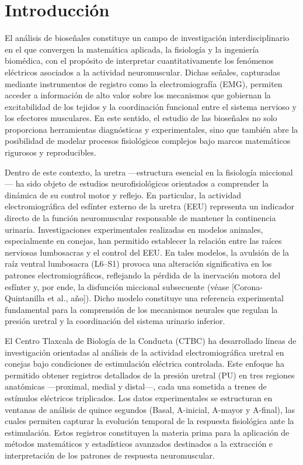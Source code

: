 \chapter*{Introducción}
\setcounter{page}{1}


\noindent El análisis de bioseñales constituye un campo de investigación interdisciplinario en el que convergen la matemática aplicada, la fisiología y la ingeniería biomédica, con el propósito de interpretar cuantitativamente los fenómenos eléctricos asociados a la actividad neuromuscular. Dichas señales, capturadas mediante instrumentos de registro como la electromiografía (EMG), permiten acceder a información de alto valor sobre los mecanismos que gobiernan la excitabilidad de los tejidos y la coordinación funcional entre el sistema nervioso y los efectores musculares. En este sentido, el estudio de las bioseñales no solo proporciona herramientas diagnósticas y experimentales, sino que también abre la posibilidad de modelar procesos fisiológicos complejos bajo marcos matemáticos rigurosos y reproducibles. 

\noindent Dentro de este contexto, la uretra —estructura esencial en la fisiología miccional— ha sido objeto de estudios neurofisiológicos orientados a comprender la dinámica de su control motor y reflejo. En particular, la actividad electromiográfica del esfínter externo de la uretra (EEU) representa un indicador directo de la función neuromuscular responsable de mantener la continencia urinaria. Investigaciones experimentales realizadas en modelos animales, especialmente en conejas, han permitido establecer la relación entre las raíces nerviosas lumbosacras y el control del EEU. En tales modelos, la avulsión de la raíz ventral lumbosacra (L6–S1) provoca una alteración significativa en los patrones electromiográficos, reflejando la pérdida de la inervación motora del esfínter y, por ende, la disfunción miccional subsecuente (véase [Corona-Quintanilla et al., año]). Dicho modelo constituye una referencia experimental fundamental para la comprensión de los mecanismos neurales que regulan la presión uretral y la coordinación del sistema urinario inferior.

\noindent El Centro Tlaxcala de Biología de la Conducta (CTBC) ha desarrollado líneas de investigación orientadas al análisis de la actividad electromiográfica uretral en conejas bajo condiciones de estimulación eléctrica controlada. Este enfoque ha permitido obtener registros detallados de la presión uretral (PU) en tres regiones anatómicas —proximal, medial y distal—, cada una sometida a trenes de estímulos eléctricos triplicados. Los datos experimentales se estructuran en ventanas de análisis de quince segundos (Basal, A-inicial, A-mayor y A-final), las cuales permiten capturar la evolución temporal de la respuesta fisiológica ante la estimulación. Estos registros constituyen la materia prima para la aplicación de métodos matemáticos y estadísticos avanzados destinados a la extracción e interpretación de los patrones de respuesta neuromuscular.

